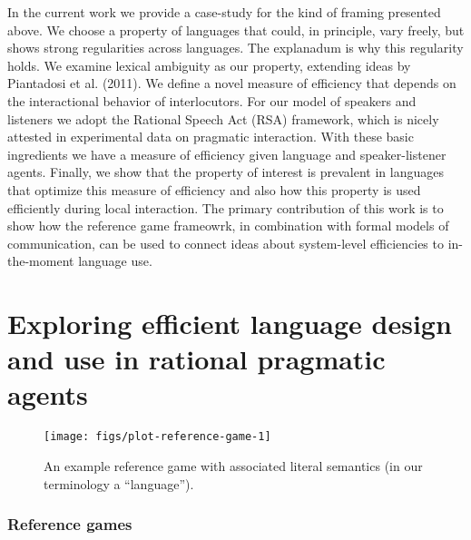\documentclass[10pt, letterpaper]{article}
\newenvironment{CodeChunk}{}{}
\begin{document}
In the current work we provide a case-study for the kind of framing
presented above. We choose a property of languages that could, in
principle, vary freely, but shows strong regularities across languages.
The explanadum is why this regularity holds. We examine lexical
ambiguity as our property, extending ideas by Piantadosi et al. (2011).
We define a novel measure of efficiency that depends on the
interactional behavior of interlocutors. For our model of speakers and
listeners we adopt the Rational Speech Act (RSA) framework, which is
nicely attested in experimental data on pragmatic interaction. With
these basic ingredients we have a measure of efficiency given language
and speaker-listener agents. Finally, we show that the property of
interest is prevalent in languages that optimize this measure of
efficiency and also how this property is used efficiently during local
interaction. The primary contribution of this work is to show how the
reference game frameowrk, in combination with formal models of
communication, can be used to connect ideas about system-level
efficiencies to in-the-moment language use.\par

\section{Exploring efficient language design and use in rational
pragmatic
agents}\label{exploring-efficient-language-design-and-use-in-rational-pragmatic-agents}

\begin{CodeChunk}
\begin{figure}[H]

{\centering \texttt{[image: figs/plot-reference-game-1]} 

}

\caption[An example reference game with associated literal semantics (in our terminology a ``language'')]{An example reference game with associated literal semantics (in our terminology a ``language'').}\label{fig:plot-reference-game}
\end{figure}
\end{CodeChunk}

\subsubsection{Reference games}\label{reference-games}
\end{document}
